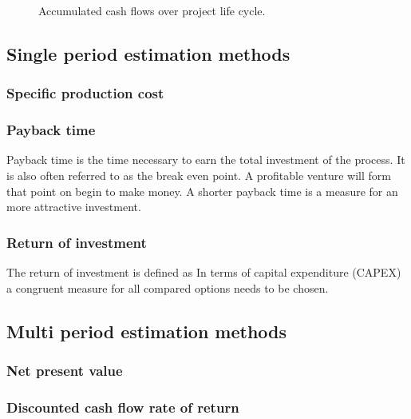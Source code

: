 \begin{figure}
	\centering
	
	\caption{Accumulated cash flows over project life cycle.}
\end{figure}

\subsection{Single period estimation methods}

\subsubsection{Specific production cost}

\subsubsection{Payback time}
 Payback time is the time necessary to earn the total investment of the process. It is also often referred to as 
 the break even point. A profitable venture will form that point on begin to make money. A shorter 
 payback time is a measure for an more attractive investment. 
\subsubsection{Return of investment}
The return of investment is defined as 
%
In terms of capital expenditure (CAPEX) a congruent measure for all compared options needs to be chosen. 

\subsection{Multi period estimation methods}

\subsubsection{Net present value}

\subsubsection{Discounted cash flow rate of return}







